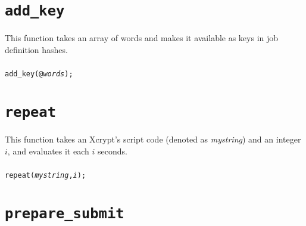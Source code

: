 \documentclass[a4paper,10pt]{report}
\begin{document}
\subsubsection{\example}



\section{\texttt{add\_key}}

This function takes an array of words and makes it available as keys in job
definition hashes.

\subsubsection{\format}

\begin{boxnote}
\begin{alltt}
add_key(@\textit{words});
\end{alltt}
\end{boxnote}
\vspace{\baselineskip}

\section{\texttt{repeat}}

This function takes an Xcrypt's script code (denoted as
\textit{mystring}) and an integer $i$, and evaluates it each $i$ seconds.

\subsubsection{\format}

\begin{boxnote}
\begin{alltt}
repeat(\textit{mystring}, \textit{i});
\end{alltt}
\end{boxnote}
\vspace{\baselineskip}

\section{\texttt{prepare\_submit}}
\end{document}

